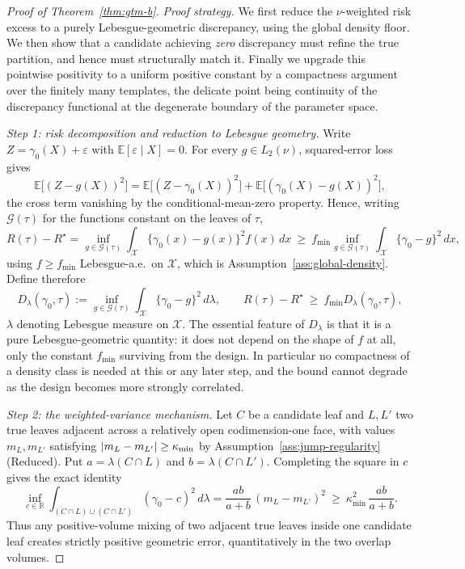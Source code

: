 \documentclass[11pt]{article}
\theoremstyle{plain}
\theoremstyle{definition}
\theoremstyle{remark}
\newcommand{\E}{\mathbb{E}}
\newcommand{\cX}{\mathcal{X}}
\newcommand{\cG}{\mathcal{G}}
\DeclarePairedDelimiter{\abs}{\lvert}{\rvert}
\begin{document}
\begin{proof}[Proof of Theorem~\ref{thm:gtm-b}]
\emph{Proof strategy.}
We first reduce the \(\nu\)-weighted risk excess to a purely
Lebesgue-geometric discrepancy, using the global density floor. We then show
that a candidate achieving \emph{zero} discrepancy must refine the true
partition, and hence must structurally match it. Finally we upgrade this
pointwise positivity to a uniform positive constant by a compactness argument
over the finitely many templates, the delicate point being continuity of the
discrepancy functional at the degenerate boundary of the parameter space.

\emph{Step 1: risk decomposition and reduction to Lebesgue geometry.}
Write \(Z=\gamma_0(X)+\varepsilon\) with \(\E[\varepsilon\mid X]=0\). For
every \(g\in L_2(\nu)\), squared-error loss gives
\[
  \E\bigl[(Z-g(X))^2\bigr]
  =
  \E\bigl[(Z-\gamma_0(X))^2\bigr]
  +\E\bigl[(\gamma_0(X)-g(X))^2\bigr],
\]
the cross term vanishing by the conditional-mean-zero property. Hence, writing
\(\cG(\tau)\) for the functions constant on the leaves of \(\tau\),
\[
  R(\tau)-R^\star
  =
  \inf_{g\in\cG(\tau)}\int_\cX\{\gamma_0(x)-g(x)\}^2f(x)\,dx
  \ \ge\
  f_{\min}\inf_{g\in\cG(\tau)}\int_\cX\{\gamma_0-g\}^2\,dx,
\]
using \(f\ge f_{\min}\) Lebesgue-a.e.\ on \(\cX\), which is
Assumption~\ref{ass:global-density}. Define therefore
\[
  D_\lambda(\gamma_0,\tau)
  :=
  \inf_{g\in\cG(\tau)}\int_\cX\{\gamma_0-g\}^2\,d\lambda,
  \qquad
  R(\tau)-R^\star\ \ge\ f_{\min}D_\lambda(\gamma_0,\tau),
\]
\(\lambda\) denoting Lebesgue measure on \(\cX\). The essential feature of
\(D_\lambda\) is that it is a pure Lebesgue-geometric quantity: it does not
depend on the shape of \(f\) at all, only the constant \(f_{\min}\) surviving
from the design. In particular no compactness of a density class is needed at
this or any later step, and the bound cannot degrade as the design becomes
more strongly correlated.

\emph{Step 2: the weighted-variance mechanism.}
Let \(C\) be a candidate leaf and \(L,L'\) two true leaves adjacent across a
relatively open codimension-one face, with values \(m_L,m_{L'}\) satisfying
\(\abs{m_L-m_{L'}}\ge\kappa_{\min}\) by
Assumption~\ref{ass:jump-regularity}(Reduced). Put \(a=\lambda(C\cap L)\) and
\(b=\lambda(C\cap L')\). Completing the square in \(c\) gives the exact
identity
\[
  \inf_{c\in\mathbb{R}}\int_{(C\cap L)\cup(C\cap L')}(\gamma_0-c)^2\,d\lambda
  =
  \frac{ab}{a+b}\,(m_L-m_{L'})^2
  \ \ge\
  \kappa_{\min}^2\,\frac{ab}{a+b}.
\]
Thus any positive-volume mixing of two adjacent true leaves inside one
candidate leaf creates strictly positive geometric error, quantitatively in
the two overlap volumes.


\end{proof}
\end{document}
